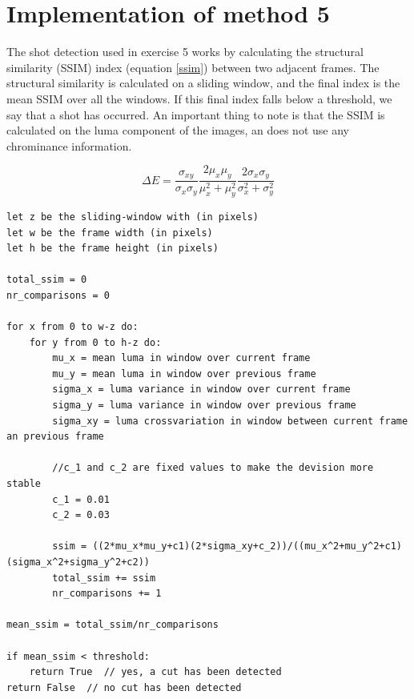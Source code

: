 \documentclass[a4paper,11pt,oneside]{article}
\begin{document}


\pagebreak


\section{Implementation of method 5}
The shot detection used in exercise 5 works by calculating the structural similarity (SSIM) index (equation \ref{ssim}) between two adjacent frames. The structural similarity is calculated on a sliding window, and the final index is the mean SSIM over all the windows.
If this final index falls below a threshold, we say that a shot has occurred. An important thing to note is that the SSIM is calculated on the luma component of the images, an does not use any chrominance information.

\begin{equation}
\label{ssim}
 \Delta E = \frac{\sigma_{xy}}{\sigma_x \sigma_y} \frac{2 \mu_x \mu_y}{\mu_x^2 + \mu_y^2} \frac{2 \sigma_x \sigma_y }{\sigma_x^2 + \sigma_y^2}
\end{equation}



\begin{lstlisting}
let z be the sliding-window with (in pixels)
let w be the frame width (in pixels)
let h be the frame height (in pixels)

total_ssim = 0
nr_comparisons = 0

for x from 0 to w-z do:
	for y from 0 to h-z do:
    	mu_x = mean luma in window over current frame
        mu_y = mean luma in window over previous frame
        sigma_x = luma variance in window over current frame
        sigma_y = luma variance in window over previous frame
        sigma_xy = luma crossvariation in window between current frame an previous frame
        
        //c_1 and c_2 are fixed values to make the devision more stable
        c_1 = 0.01
        c_2 = 0.03
        
        ssim = ((2*mu_x*mu_y+c1)(2*sigma_xy+c_2))/((mu_x^2+mu_y^2+c1)(sigma_x^2+sigma_y^2+c2))
        total_ssim += ssim
        nr_comparisons += 1

mean_ssim = total_ssim/nr_comparisons

if mean_ssim < threshold:
	return True  // yes, a cut has been detected
return False  // no cut has been detected
\end{lstlisting}
\vspace{-1cm}
\end{document}
